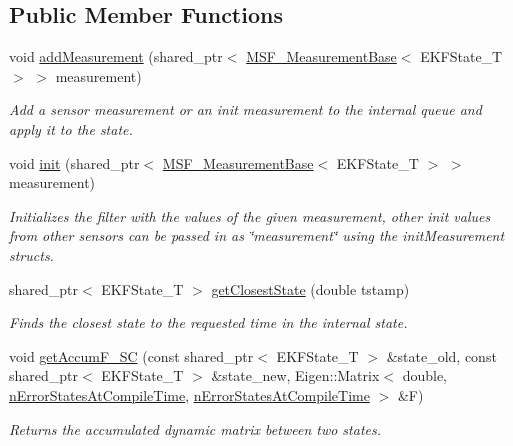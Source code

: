 \subsection*{Public Member Functions}
\begin{DoxyCompactItemize}
\item 
void \hyperlink{classmsf__core_1_1MSF__Core_ac4b9bb4a30b0e1817a5cd07e843d6723}{add\-Measurement} (shared\-\_\-ptr$<$ \hyperlink{classmsf__core_1_1MSF__MeasurementBase}{M\-S\-F\-\_\-\-Measurement\-Base}$<$ E\-K\-F\-State\-\_\-\-T $>$ $>$ measurement)
\begin{DoxyCompactList}\small\item\em Add a sensor measurement or an init measurement to the internal queue and apply it to the state. \end{DoxyCompactList}\item 
void \hyperlink{classmsf__core_1_1MSF__Core_a68e27c538b3c7a255d1b5260ca00b52e}{init} (shared\-\_\-ptr$<$ \hyperlink{classmsf__core_1_1MSF__MeasurementBase}{M\-S\-F\-\_\-\-Measurement\-Base}$<$ E\-K\-F\-State\-\_\-\-T $>$ $>$ measurement)
\begin{DoxyCompactList}\small\item\em Initializes the filter with the values of the given measurement, other init values from other sensors can be passed in as \char`\"{}measurement\char`\"{} using the init\-Measurement structs. \end{DoxyCompactList}\item 
shared\-\_\-ptr$<$ E\-K\-F\-State\-\_\-\-T $>$ \hyperlink{classmsf__core_1_1MSF__Core_acc5117f9c7f79d9114a63033cbdeb9cb}{get\-Closest\-State} (double tstamp)
\begin{DoxyCompactList}\small\item\em Finds the closest state to the requested time in the internal state. \end{DoxyCompactList}\item 
void \hyperlink{classmsf__core_1_1MSF__Core_af7d1cc22cc28fd4ccabda47cd2ff5888}{get\-Accum\-F\-\_\-\-S\-C} (const shared\-\_\-ptr$<$ E\-K\-F\-State\-\_\-\-T $>$ \&state\-\_\-old, const shared\-\_\-ptr$<$ E\-K\-F\-State\-\_\-\-T $>$ \&state\-\_\-new, Eigen\-::\-Matrix$<$ double, \hyperlink{classmsf__core_1_1MSF__Core_a2bca35a2fba08b2fd5cc9963acc9c505afd5aaa703aae2fc6f022eec724b358f6}{n\-Error\-States\-At\-Compile\-Time}, \hyperlink{classmsf__core_1_1MSF__Core_a2bca35a2fba08b2fd5cc9963acc9c505afd5aaa703aae2fc6f022eec724b358f6}{n\-Error\-States\-At\-Compile\-Time} $>$ \&F)
\begin{DoxyCompactList}\small\item\em Returns the accumulated dynamic matrix between two states. \end{DoxyCompactList}\item 

\end{DoxyCompactItemize}

